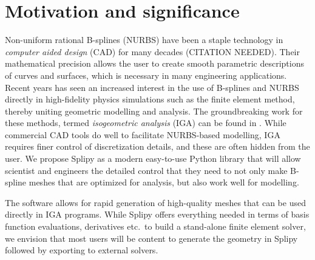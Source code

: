 \documentclass[preprint,12pt, a4paper]{elsarticle}
\begin{document}
\linenumbers


\section{Motivation and significance}
\label{sec:motivation}

Non-uniform rational B-splines (NURBS) have been a staple technology in \emph{computer aided design} (CAD) for many decades (CITATION NEEDED).
Their mathematical precision allows the user to create smooth parametric descriptions of curves and surfaces, which is necessary in many engineering applications.
Recent years has seen an increased interest in the use of B-splines and NURBS directly in high-fidelity physics simulations such as the finite element method, thereby uniting geometric modelling and analysis.
The groundbreaking work for these methods, termed \emph{isogeometric analysis} (IGA) can be found in \cite{hughes2005iac}.
While commercial CAD tools do well to facilitate NURBS-based modelling, IGA requires finer control of discretization details, and these are often hidden from the user.
We propose Splipy as a modern easy-to-use Python library that will allow scientist and engineers the detailed control that they need to not only make B-spline meshes that are optimized for analysis, but also work well for modelling.

The software allows for rapid generation of high-quality meshes that can be used directly in IGA programs.
While Splipy offers everything needed in terms of basis function evaluations, derivatives etc.~to build a stand-alone finite element solver, we envision that most users will be content to generate the geometry in Splipy followed by exporting to external solvers.

\end{document}
